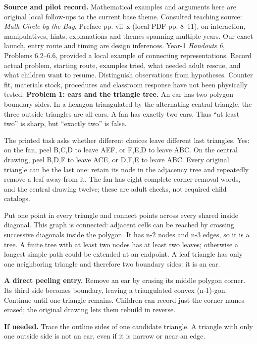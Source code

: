 \documentclass[11pt]{article}
\begin{document}
\textbf{Source and pilot record.} Mathematical examples and arguments here are original local follow-ups to the current base theme. Consulted teaching source: \emph{Math Circle by the Bay}, Preface pp. vii--x (local PDF pp. 8--11), on interaction, manipulatives, hints, explanations and themes spanning multiple years. Our exact launch, entry route and timing are design inferences. Year-1 \emph{Handouts 6}, Problems 6.2--6.6, provided a local example of connecting representations. Record actual problem, starting route, examples tried, what needed adult rescue, and what children want to resume. Distinguish observations from hypotheses. Counter fit, materials stock, procedures and classroom response have not been physically tested.
\newpage
\textbf{Problem 1: ears and the triangle tree.} An ear has two polygon boundary sides. In a hexagon triangulated by the alternating central triangle, the three outside triangles are all ears. A fan has exactly two ears. Thus ``at least two'' is sharp, but ``exactly two'' is false.

The printed task asks whether different choices leave different last triangles. Yes: on the fan, peel B,C,D to leave AEF, or F,E,D to leave ABC. On the central drawing, peel B,D,F to leave ACE, or D,F,E to leave ABC. Every original triangle can be the last one: retain its node in the adjacency tree and repeatedly remove a leaf away from it. The fan has eight complete corner-removal words, and the central drawing twelve; these are adult checks, not required child catalogs.

Put one point in every triangle and connect points across every shared inside diagonal. This graph is connected: adjacent cells can be reached by crossing successive diagonals inside the polygon. It has n-2 nodes and n-3 edges, so it is a tree. A finite tree with at least two nodes has at least two leaves; otherwise a longest simple path could be extended at an endpoint. A leaf triangle has only one neighboring triangle and therefore two boundary sides: it is an ear.

\textbf{A direct peeling entry.} Remove an ear by erasing its middle polygon corner. Its third side becomes boundary, leaving a triangulated convex (n-1)-gon. Continue until one triangle remains. Children can record just the corner names erased; the original drawing lets them rebuild in reverse.

\textbf{If needed.} Trace the outline sides of one candidate triangle. A triangle with only one outside side is not an ear, even if it is narrow or near an edge.
\end{document}
